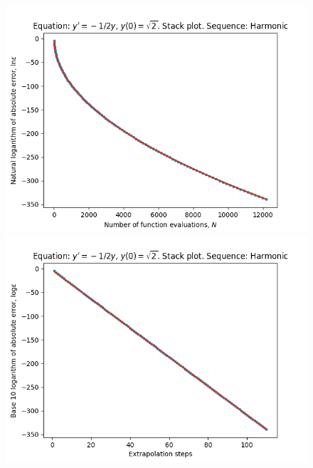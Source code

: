 \begin{figure}[H]
\centering
\begin{minipage}{0.45\textwidth}
\centering
\includegraphics[scale=0.45]{emr_plots/quad_sing_0_hp_harmonic_stack.png}
\end{minipage}
\begin{minipage}{0.45\textwidth}
\centering
\includegraphics[scale=0.45]{emr_plots/quad_sing_0_hp_harmonic_steps_stack.png}
\end{minipage}
\end{figure}

